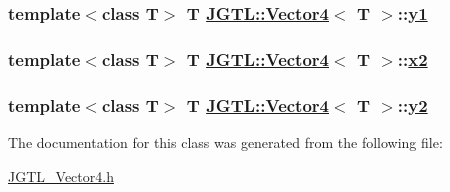 \hypertarget{class_j_g_t_l_1_1_vector4_250752a0a9e741820f6c2ecfeae4be22}{
\subsubsection[y1]{\setlength{\rightskip}{0pt plus 5cm}template$<$class T$>$ T \hyperlink{class_j_g_t_l_1_1_vector4}{JGTL::Vector4}$<$ T $>$::\hyperlink{class_j_g_t_l_1_1_vector4_250752a0a9e741820f6c2ecfeae4be22}{y1}}}
\label{class_j_g_t_l_1_1_vector4_250752a0a9e741820f6c2ecfeae4be22}


\hypertarget{class_j_g_t_l_1_1_vector4_aebd3becf0bcf754b0ec7dc2c4c7a1ed}{
\subsubsection[x2]{\setlength{\rightskip}{0pt plus 5cm}template$<$class T$>$ T \hyperlink{class_j_g_t_l_1_1_vector4}{JGTL::Vector4}$<$ T $>$::\hyperlink{class_j_g_t_l_1_1_vector4_aebd3becf0bcf754b0ec7dc2c4c7a1ed}{x2}}}
\label{class_j_g_t_l_1_1_vector4_aebd3becf0bcf754b0ec7dc2c4c7a1ed}


\hypertarget{class_j_g_t_l_1_1_vector4_5d6fc887b288b2688f7bcb31ee685d25}{
\subsubsection[y2]{\setlength{\rightskip}{0pt plus 5cm}template$<$class T$>$ T \hyperlink{class_j_g_t_l_1_1_vector4}{JGTL::Vector4}$<$ T $>$::\hyperlink{class_j_g_t_l_1_1_vector4_5d6fc887b288b2688f7bcb31ee685d25}{y2}}}
\label{class_j_g_t_l_1_1_vector4_5d6fc887b288b2688f7bcb31ee685d25}




The documentation for this class was generated from the following file:\begin{CompactItemize}
\item 
\hyperlink{_j_g_t_l___vector4_8h}{JGTL\_\-Vector4.h}\end{CompactItemize}

